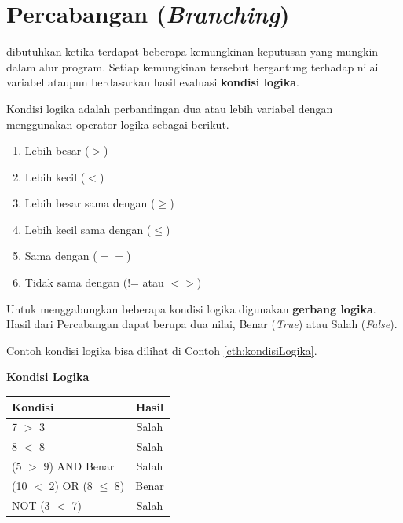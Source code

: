 \chapter{Percabangan (\textit{Branching})}
 dibutuhkan ketika terdapat beberapa kemungkinan keputusan yang mungkin dalam alur program. Setiap kemungkinan tersebut bergantung terhadap nilai variabel ataupun berdasarkan hasil evaluasi \textbf{kondisi logika}. 

Kondisi logika adalah perbandingan dua atau lebih variabel dengan menggunakan operator logika sebagai berikut.
\begin{enumerate}
	\item Lebih besar ($>$)
	\item Lebih kecil ($<$)
	\item Lebih besar sama dengan ($\geq$)
	\item Lebih kecil sama dengan ($\leq$)
	\item Sama dengan ($==$)
	\item Tidak sama dengan (!= atau $<>$)
\end{enumerate}

Untuk menggabungkan beberapa kondisi logika digunakan \textbf{gerbang logika}.\\
Hasil dari Percabangan dapat berupa dua nilai, Benar (\textit{True}) atau Salah (\textit{False}).

Contoh kondisi logika bisa dilihat di Contoh \ref{cth:kondisiLogika}.
\begin{contoh}
\label{cth:kondisiLogika}
\textbf{Kondisi Logika}\\

\begin{table}
	\centering
	\begin{tabular}{  l  c  }
	\hline
	Kondisi & Hasil \\
	\hline
	7 $>$ 3 & Salah \\
	8 $<$ 8 & Salah \\
	(5 $>$ 9) AND Benar & Salah \\
	(10 $<$ 2) OR (8 $\leq$ 8) & Benar \\
	NOT (3 $<$ 7) & Salah \\
	\hline
	\end{tabular}
\label{table:tabellogika}
\end{table}
\end{contoh}


